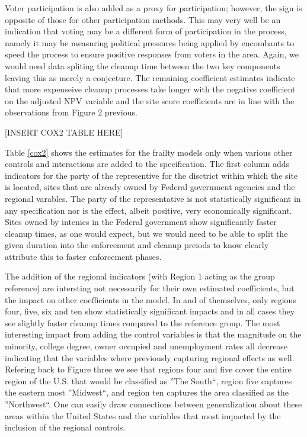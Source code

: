 \documentclass[12pt]{article}
\begin{document}
{Voter participation is also added as a proxy for participation; however, the sign is opposite of those for other participation methods. This may very well be an indication that voting may be a different form of participation in the process, namely it may be measuring political pressures being applied by encombants to speed the process to ensure positive responses from voters in the area. Again, we would need data spliting the cleanup time between the two key components leaving this as merely a conjecture. The remaining coefficient estimates indicate that more expenseive cleanup processes take longer with the negative coefficient on the adjusted NPV variable and the site score coefficients are in line with the observations from Figure 2 previous. 

[INSERT COX2 TABLE HERE]

Table \ref{cox2} shows the estimates for the frailty models only when various other controls and interactions are added to the specification. The first column adds indicators for the party of the representive for the disctrict within which the site is located, sites that are already owned by Federal government agencies and the regional varables. The party of the representative is not statistically significant in any specification nor is the effect, albeit positive, very economically significant. Sites owned by intenies in the Federal government show significantly faster cleanup times, as one would expect, but we would need to be able to split the given duration into the enforcement and cleanup preiods to know clearly attribute this to faster enforcement phases. 

The addition of the regional indicators (with Region 1 acting as the group reference) are intersting not necessarily for their own estimated coefficients, but the impact on other coefficients in the model. In and of themselves, only regions four, five, six and ten show statistically significant impacts and in all cases they see slightly faster cleanup times compared to the reference group. The most interesting impact from adding the control variables is that the magnitude on the minority, college degree, owner occupied and unemployment rates all decrease indicating that the variables where previously capturing regional effects as well. Refering back to Figure three we see that regions four and five cover the entire region of the U.S. that would be classified as ''The South``, region five captures the eastern most ''Midwest``, and region ten captures the area classified as the ''Northwest``. One can easily draw connections between generalization about these areas within the United States and the variables that most impacted by the inclusion of the regional controls. 

}
\end{document}
